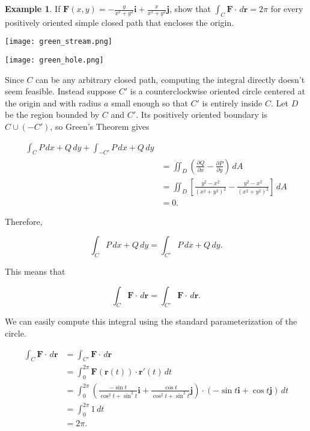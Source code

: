 \documentclass[11pt,oneside,english]{amsart}
\theoremstyle{definition}
\newtheorem*{example}{Example}
\newcommand{\pp}[2]{\frac{\partial{#1}}{\partial{#2}}}
\begin{document}
\begin{example}
If $\mathbf{F}(x,y)=-\frac{y}{x^2+y^2}\mathbf{i}+\frac{x}{x^2+y^2}\mathbf{j}$, show that $\int_C\mathbf{F}\cdot\,d\mathbf{r}=2\pi$ for every positively oriented simple closed path that encloses the origin.


\begin{minipage}{0.5\textwidth}
\begin{center}
\texttt{[image: green\_stream.png]}
\end{center}
\end{minipage}%
\begin{minipage}{0.5\textwidth}
\begin{center}
\texttt{[image: green\_hole.png]}
\end{center}
\end{minipage}



Since $C$ can be any arbitrary closed path, computing the integral directly doesn't seem feasible. Instead suppose $C'$ is a counterclockwise oriented circle centered at the origin and with radius $a$ small enough so that $C'$ is entirely inside $C$. Let $D$ be the region bounded by $C$ and $C'$. Its positively oriented boundary is $C\cup (-C')$, so Green's Theorem gives

\begin{align*}
\int_CP\,dx+Q\,dy+\int_{-C'}P\,dx+Q\,dy\\[2mm]
&=\iint_D\left(\pp{Q}{x}-\pp{P}{y}\right)\,dA\\[2mm]
&=\iint_D\left[\frac{y^2-x^2}{(x^2+y^2)^2}-\frac{y^2-x^2}{(x^2+y^2)^2}\right]\,dA\\[2mm]
&=0.
\end{align*}

Therefore, 

\[
\int_CP\,dx+Q\,dy=\int_{C'}P\,dx+Q\,dy.
\]

This means that 


\[
\int_C\mathbf{F}\cdot\,d\mathbf{r}=\int_{C'}\mathbf{F}\cdot\,d\mathbf{r}.
\]

We can easily compute this integral using the standard parameterization of the circle.

\begin{align*}
\int_C\mathbf{F}\cdot\,d\mathbf{r}&=\int_{C'}\mathbf{F}\cdot\,d\mathbf{r}\\[2mm]
&=\int_0^{2\pi}\mathbf{F}(\mathbf{r}(t))\cdot\mathbf{r}'(t)\,dt\\[2mm]
&=\int_0^{2\pi}\left(\frac{-\sin t}{\cos^2t+\sin^2t}\mathbf{i}+\frac{\cos t}{\cos^2t+\sin^2t}\mathbf{j}\right)\cdot(-\sin t\mathbf{i}+\cos t\mathbf{j})\,dt\\[2mm]
&=\int_0^{2\pi}1\,dt\\[2mm]
&=2\pi.
\end{align*}
\end{example}
\end{document}
